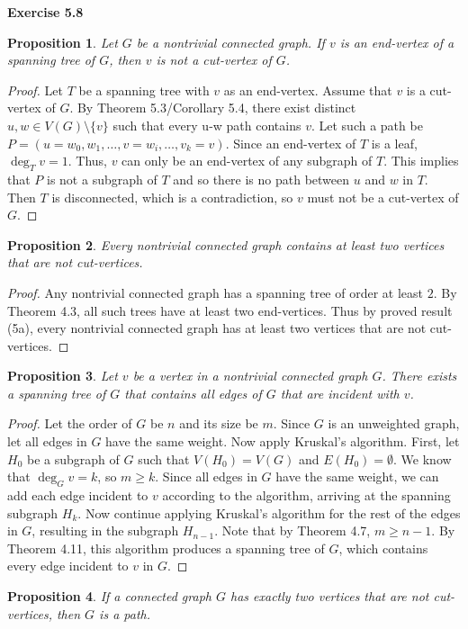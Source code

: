 \documentclass[12pt]{article}
\newtheorem*{prop*}{Proposition}
\begin{document}
\noindent\textbf{Exercise 5.8}
\begin{prop*}
Let $G$ be a nontrivial connected graph. If $v$ is an end-vertex of a spanning tree of $G$, then $v$ is not a cut-vertex of $G$.
\end{prop*}
\begin{proof}
Let $T$ be a spanning tree with $v$ as an end-vertex. Assume that $v$ is a cut-vertex of $G$. By Theorem 5.3/Corollary 5.4, there exist distinct $u,w \in V(G) \setminus \{v\}$ such that every u-w path contains $v$. Let such a path be $P = (u = w_0, w_1, \dots, v = w_i, \dots, v_k = v)$. Since an end-vertex of $T$ is a leaf, $\deg_T v = 1$. Thus, $v$ can only be an end-vertex of any subgraph of $T$. This implies that $P$ is not a subgraph of $T$ and so there is no path between $u$ and $w$ in $T$. Then $T$ is disconnected, which is a contradiction, so $v$ must not be a cut-vertex of $G$.
\end{proof}
\begin{prop*}
Every nontrivial connected graph contains at least two vertices that are not cut-vertices.
\end{prop*}
\begin{proof}
Any nontrivial connected graph has a spanning tree of order at least $2$. By Theorem 4.3, all such trees have at least two end-vertices. Thus by proved result (5a), every nontrivial connected graph has at least two vertices that are not cut-vertices.
\end{proof}
\begin{prop*}
Let $v$ be a vertex in a nontrivial connected graph $G$. There exists a spanning tree of $G$ that contains all edges of $G$ that are incident with $v$.
\end{prop*}
\begin{proof}
Let the order of $G$ be $n$ and its size be $m$. Since $G$ is an unweighted graph, let all edges in $G$ have the same weight. Now apply Kruskal's algorithm. First, let  $H_0$ be a subgraph of $G$ such that $V(H_0) = V(G)$ and $E(H_0) = \emptyset$. We know that $\deg_G v = k$, so $m \geq k$. Since all edges in $G$ have the same weight, we can add each edge incident to $v$ according to the algorithm, arriving at the spanning subgraph $H_k$. Now continue applying Kruskal's algorithm for the rest of the edges in $G$, resulting in the subgraph $H_{n-1}$. Note that by Theorem 4.7, $m \geq n-1$. By Theorem 4.11, this algorithm produces a spanning tree of $G$, which contains every edge incident to $v$ in $G$.
\end{proof}
\begin{prop*}
If a connected graph $G$ has exactly two vertices that are not cut-vertices, then $G$ is a path.
\end{prop*}
\end{document}
